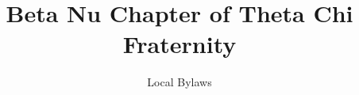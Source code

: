 \documentclass[oneside,openany]{book}
\title{Beta Nu Chapter of Theta Chi Fraternity}
\author{Local Bylaws}
\begin{document}
\maketitle
\frontmatter
\tableofcontents



\mainmatter


\glsresetall %

\glsresetall

\glsresetall

\glsresetall

\glsresetall

\glsresetall

\glsresetall

\glsresetall

\glsresetall

\glsresetall

\glsresetall

\glsaddall
\printglossaries

\appendix




\end{document}
